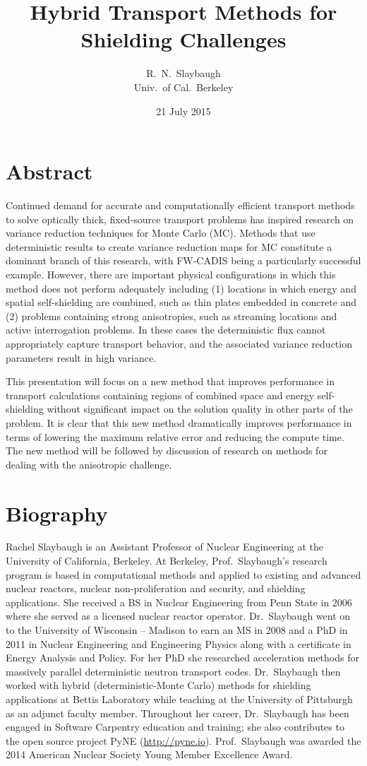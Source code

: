 \documentclass[12pt]{article}
\title{Hybrid Transport Methods for Shielding Challenges}
\author{R.\ N.\ Slaybaugh \\ Univ.\ of Cal.\ Berkeley}
\date{21 July 2015}
\begin{document}
\maketitle

\section*{Abstract}

Continued demand for accurate and computationally efficient transport methods to solve optically thick, fixed-source transport problems has inspired research on variance reduction techniques for Monte Carlo (MC). Methods that use deterministic results to create variance reduction maps for MC constitute a dominant branch of this research, with FW-CADIS being a particularly successful example. However, there are important physical configurations in which this method does not perform adequately including (1) locations in which energy and spatial self-shielding are combined, such as thin plates embedded in concrete and (2) problems containing strong anisotropies, such as streaming locations and active interrogation problems. In these cases the deterministic flux cannot appropriately capture transport behavior, and the associated variance reduction parameters result in high variance. 

This presentation will focus on a new method that improves performance in transport calculations containing regions of combined space and energy self-shielding without significant impact on the solution quality in other parts of the problem. It is clear that this new method dramatically improves performance in terms of lowering the maximum relative error and reducing the compute time. The new method will be followed by discussion of research on methods for dealing with the anisotropic challenge.

\section*{Biography}
Rachel Slaybaugh is an Assistant Professor of Nuclear Engineering at the University of California, Berkeley. At Berkeley, Prof.\ Slaybaugh's research program is based in computational methods and applied to existing and advanced nuclear reactors, nuclear non-proliferation and security, and shielding applications. She received a BS in Nuclear Engineering from Penn State in 2006 where she served as a licensed nuclear reactor operator. Dr.\ Slaybaugh went on to the University of Wisconsin -- Madison to earn an MS in 2008 and a PhD in 2011 in Nuclear Engineering and Engineering Physics along with a certificate in Energy Analysis and Policy. For her PhD she researched acceleration methods for massively parallel deterministic neutron transport codes. Dr.\ Slaybaugh then worked with hybrid (deterministic-Monte Carlo) methods for shielding applications at Bettis Laboratory while teaching at the University of Pittsburgh as an adjunct faculty member. Throughout her career, Dr.\ Slaybaugh has been engaged in Software Carpentry education and training; she also contributes to the open source project PyNE (\href{http://pyne.io}{http://pyne.io}). Prof.\ Slaybaugh was awarded the 2014 American Nuclear Society Young Member Excellence Award.
\end{document}
